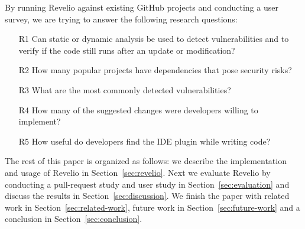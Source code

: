 By running Revelio against existing GitHub projects and conducting a user survey, we are trying to answer the following research questions:
\begin{itemize}
\item [R1] Can static or dynamic analysis be used to detect vulnerabilities and to verify if the code still runs after an update or modification?
\item [R2] How many popular projects have dependencies that pose security risks?
\item [R3] What are the most commonly detected vulnerabilities?
\item [R4] How many of the suggested changes were developers willing to implement?
\item [R5] How useful do developers find the IDE plugin while writing code?
\end{itemize}

The rest of this paper is organized as follows: we describe the implementation and usage of Revelio in Section~\ref{sec:revelio}. Next we evaluate Revelio by conducting a pull-request study and user study in Section~\ref{sec:evaluation} and discuss the results in Section~\ref{sec:discussion}. We finish the paper with related work in Section~\ref{sec:related-work}, future work in Section~\ref{sec:future-work} and a conclusion in Section~\ref{sec:conclusion}.

